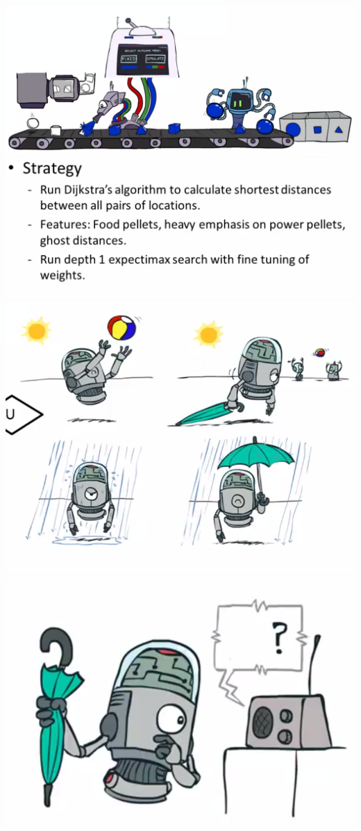 \documentclass[twocolumn]{article}
\begin{document}
{\includegraphics[scale=0.35]{snapshot134}\\
\includegraphics[scale=0.5]{snapshot135}\\
\includegraphics[scale=0.7]{snapshot137}\\
\includegraphics[scale=0.7]{snapshot138}\\
}
\end{document}
